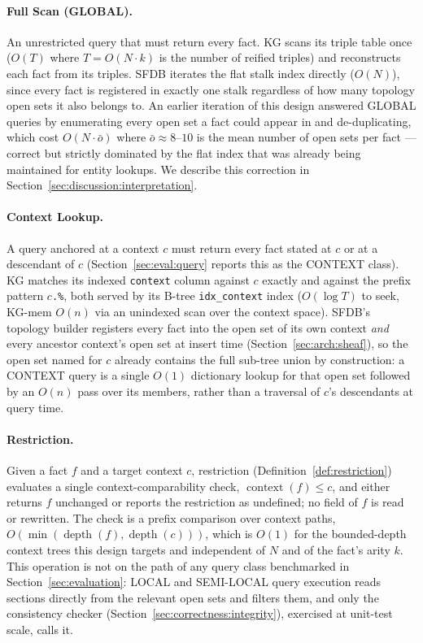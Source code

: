 \paragraph{Full Scan (GLOBAL).} An unrestricted query that must return every
fact. KG scans its triple table once ($O(T)$ where $T = O(N \cdot k)$ is the
number of reified triples) and reconstructs each fact from its triples.
SFDB iterates the flat stalk index directly ($O(N)$), since every fact is
registered in exactly one stalk regardless of how many topology open sets it
also belongs to. An earlier iteration of this design answered GLOBAL queries
by enumerating every open set a fact could appear in and de-duplicating,
which cost $O(N \cdot \bar{o})$ where $\bar{o} \approx 8$--$10$ is the mean
number of open sets per fact --- correct but strictly dominated by the flat
index that was already being maintained for entity lookups. We describe this
correction in Section~\ref{sec:discussion:interpretation}.

\paragraph{Context Lookup.} A query anchored at a context $c$ must return
every fact stated at $c$ or at a descendant of $c$
(Section~\ref{sec:eval:query} reports this as the CONTEXT class). KG
matches its indexed \texttt{context} column against $c$ exactly and
against the prefix pattern $c$\texttt{.\%}, both served by its
B-tree \texttt{idx\_context} index ($O(\log T)$ to seek, KG-mem $O(n)$
via an unindexed scan over the context space). SFDB's topology builder
registers every fact into the open set of its own context \emph{and}
every ancestor context's open set at insert time
(Section~\ref{sec:arch:sheaf}), so the open set
named for $c$ already contains the full sub-tree union by construction:
a CONTEXT query is a single $O(1)$ dictionary lookup for that open set
followed by an $O(n)$ pass over its members, rather than a traversal of
$c$'s descendants at query time.

\paragraph{Restriction.} Given a fact $f$ and a target context $c$,
restriction (Definition~\ref{def:restriction}) evaluates a single
context-comparability check, $\operatorname{context}(f) \leq c$, and
either returns $f$ unchanged or reports the restriction as undefined; no
field of $f$ is read or rewritten. The check is a prefix comparison over
context paths, $O(\min(\operatorname{depth}(f), \operatorname{depth}(c)))$,
which is $O(1)$ for the bounded-depth context trees this design targets
and independent of $N$ and of the fact's arity $k$. This operation is not
on the path of any query class benchmarked in
Section~\ref{sec:evaluation}: LOCAL and SEMI-LOCAL query execution reads
sections directly from the relevant open sets and filters them, and only
the consistency checker (Section~\ref{sec:correctness:integrity}), exercised
at unit-test scale, calls it.

